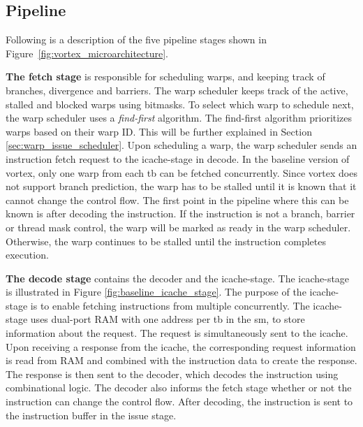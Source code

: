 \subsection{Pipeline} \label{sec:vortex_pipeline}
Following is a description of the five pipeline stages shown in Figure~\ref{fig:vortex_microarchitecture}.

\vspace{1mm}\noindent
\textbf{The fetch stage} is responsible for scheduling warps, and keeping track of branches, divergence and barriers. The warp scheduler keeps track of the active, stalled and blocked warps using bitmasks. To select which warp to schedule next, the warp scheduler uses a \textit{find-first} algorithm. The find-first algorithm prioritizes warps based on their warp ID. This will be further explained in Section \ref{sec:warp_issue_scheduler}. Upon scheduling a warp, the warp scheduler sends an instruction fetch request to the icache-stage in decode. In the baseline version of \Gls{vortex}, only one warp from each \acrshort{tb} can be fetched concurrently. Since \Gls{vortex} does not support branch prediction, the warp has to be stalled until it is known that it cannot change the control flow. The first point in the pipeline where this can be known is after decoding the instruction. If the instruction is not a branch, barrier or thread mask control, the warp will be marked as ready in the warp scheduler. Otherwise, the warp continues to be stalled until the instruction completes execution. 

\noindent
\textbf{The decode stage} contains the decoder and the icache-stage. The icache-stage is illustrated in Figure \ref{fig:baseline_icache_stage}. The purpose of the icache-stage is to enable fetching instructions from multiple  concurrently. The icache-stage uses dual-port RAM with one address per \acrshort{tb} in the \acrshort{sm}, to store information about the request. The request is simultaneously sent to the icache. Upon receiving a response from the icache, the corresponding request information is read from RAM and combined with the instruction data to create the response. The response is then sent to the decoder, which decodes the instruction using combinational logic. The decoder also informs the fetch stage whether or not the instruction can change the control flow. After decoding, the instruction is sent to the instruction buffer in the issue stage.

